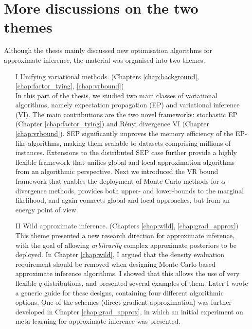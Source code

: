 \section{More discussions on the two themes}
\label{sec:conclusion_compare}

Although the thesis mainly discussed new optimisation algorithms for approximate inference, the material was organised into two themes.
\begin{itemize}
\item[I] Unifying variational methods. (Chapters \ref{chap:background}, \ref{chap:factor_tying}, \ref{chap:vrbound}) \\
In this part of the thesis, we studied two main classes of variational algorithms, namely expectation propagation (EP) and variational inference (VI). The main contributions are the two novel frameworks: stochastic EP (Chapter \ref{chap:factor_tying}) and R{\'e}nyi divergence VI (Chapter \ref{chap:vrbound}). SEP significantly improves the memory efficiency of the EP-like algorithms, making them scalable to datasets comprising millions of instances. Extensions to the distributed SEP case further provide a highly flexible framework that unifies global and local approximation algorithms from an algorithmic perspective. Next we introduced the VR bound framework that enables the deployment of Monte Carlo methods for $\alpha$-divergence methods, provides both upper- and lower-bounds to the marginal likelihood, and again connects global and local approaches, but from an energy point of view.

\item[II] Wild approximate inference. (Chapters \ref{chap:wild}, \ref{chap:grad_approx}) \\
This theme presented a new research direction for approximate inference, with the goal of allowing \emph{arbitrarily} complex approximate posteriors to be deployed. In Chapter \ref{chap:wild}, I argued that the density evaluation requirement should be removed when designing Monte Carlo based approximate inference algorithms. I showed that this allows the use of very flexible $q$ distributions, and presented several examples of them. Later I wrote a generic guide for these designs, containing four different algorithmic options. One of the schemes (direct gradient approximation) was further developed in Chapter \ref{chap:grad_approx}, in which an initial experiment on meta-learning for approximate inference was presented.
\end{itemize}

